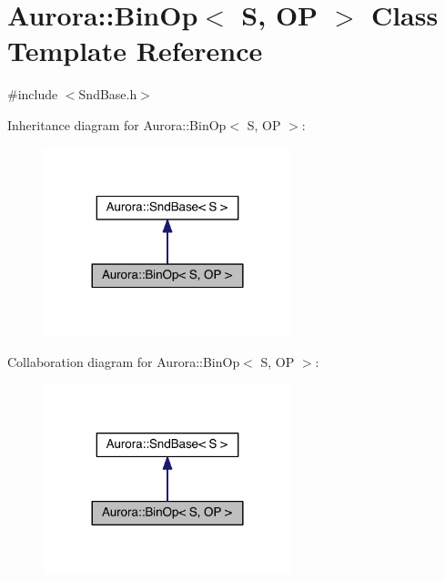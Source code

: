 \hypertarget{class_aurora_1_1_bin_op}{}\section{Aurora\+:\+:Bin\+Op$<$ S, OP $>$ Class Template Reference}
\label{class_aurora_1_1_bin_op}


{\ttfamily \#include $<$Snd\+Base.\+h$>$}



Inheritance diagram for Aurora\+:\+:Bin\+Op$<$ S, OP $>$\+:
\nopagebreak
\begin{figure}[H]
\begin{center}
\leavevmode
\includegraphics[width=204pt]{class_aurora_1_1_bin_op__inherit__graph}
\end{center}
\end{figure}


Collaboration diagram for Aurora\+:\+:Bin\+Op$<$ S, OP $>$\+:
\nopagebreak
\begin{figure}[H]
\begin{center}
\leavevmode
\includegraphics[width=204pt]{class_aurora_1_1_bin_op__coll__graph}
\end{center}
\end{figure}
